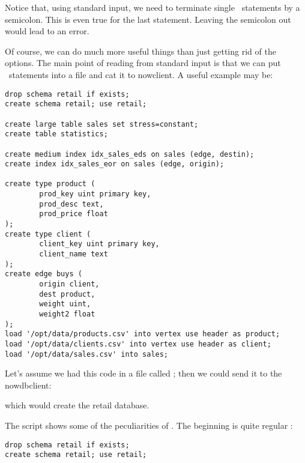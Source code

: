 
Notice that, using standard input,
we need to terminate single \sql\ statements
by a semicolon. This is even true for the last statement.
Leaving the semicolon out would lead to an error.

Of course, we can do much more useful things than just
getting rid of the options.
The main point of reading from standard input is
that we can put \sql\ statements into a file and
cat it to nowclient. A useful example may be:

\begin{sqlcode}
\begin{lstlisting}
drop schema retail if exists;
create schema retail; use retail;

create large table sales set stress=constant;
create table statistics;

create medium index idx_sales_eds on sales (edge, destin);
create index idx_sales_eor on sales (edge, origin);

create type product (
        prod_key uint primary key,
        prod_desc text,
        prod_price float
);
create type client (
        client_key uint primary key,
        client_name text
);
create edge buys (
        origin client,
        dest product,
        weight uint,
        weight2 float
);
load '/opt/data/products.csv' into vertex use header as product;
load '/opt/data/clients.csv' into vertex use header as client;
load '/opt/data/sales.csv' into sales;
\end{lstlisting}
\end{sqlcode}

Let's assume we had this code in a file called
; then we could
send it to the nowdbclient:


which would create the retail database.

The script shows some of the peculiarities of \nowdb.
The beginning is quite regular \sql:

\begin{sqlcode}
\begin{lstlisting}
drop schema retail if exists;
create schema retail; use retail;
\end{lstlisting}
\end{sqlcode}

